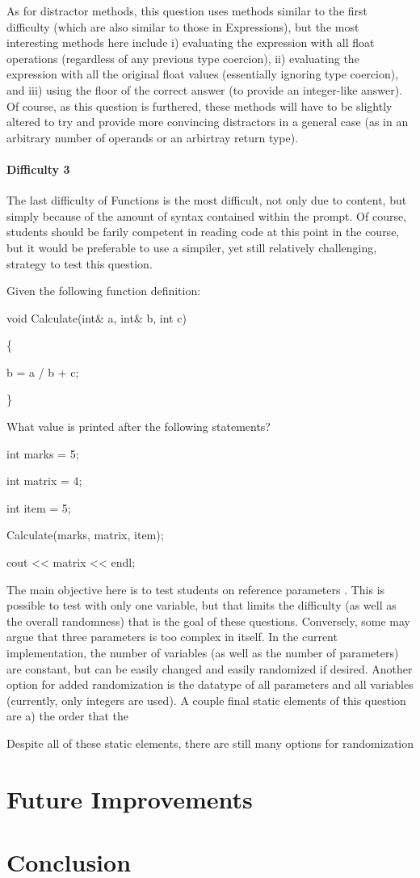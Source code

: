 \documentclass{article}
\begin{document}
As for distractor methods, this question uses methods similar to the first difficulty (which are also similar to those in Expressions), but the most interesting methods here include i) evaluating the expression with all float operations (regardless of any previous type coercion), ii) evaluating the expression with all the original float values (essentially ignoring type coercion), and iii) using the floor of the correct answer (to provide an integer-like answer). Of course, as this question is furthered, these methods will have to be slightly altered to try and provide more convincing distractors in a general case (as in an arbitrary number of operands or an arbirtray return type).

\paragraph{Difficulty 3} \hfill \par

The last difficulty of Functions is the most difficult, not only due to content, but simply because of the amount of syntax contained within the prompt. Of course, students should be farily competent in reading code at this point in the course, but it would be preferable to use a simpiler, yet still relatively challenging, strategy to test this question.

\hfill \par
Given the following function definition:\par
void Calculate(int\& a, int\& b, int c)\par
\{\par
	b = a / b + c;\par
\}\par

What value is printed after the following statements?\par
int marks = 5;\par
int matrix = 4;\par
int item = 5;\par
Calculate(marks, matrix, item);\par
cout << matrix << endl;\par
\hfill \par

The main objective here is to test students on reference parameters . This is possible to test with only one variable, but that limits the difficulty (as well as the overall randomness) that is the goal of these questions. Conversely, some may argue that three parameters is too complex in itself. In the current implementation, the number of variables (as well as the number of parameters) are constant, but can be easily changed and easily randomized if desired. Another option for added randomization is the datatype of all parameters and all variables (currently, only integers are used). A couple final static elements of this question are a) the order that the 

Despite all of these static elements, there are still many options for randomization 

\section{Future Improvements}


\section{Conclusion}

\end{document}
